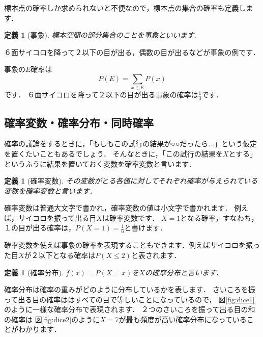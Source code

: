 \documentclass[11pt]{report}
\newtheorem{definition}[theorem]{定義}
\begin{document}
標本点の確率しか求められないと不便なので，標本点の集合の確率も定義します．

\begin{definition}[事象]
	標本空間の部分集合のことを事象といいます.
\end{definition}

６面サイコロを降って２以下の目が出る，偶数の目が出るなどが事象の例です．

事象の$E$確率は
\begin{equation*}
	P(E) = \sum_{x \in E} P(x)
\end{equation*}
です．
６面サイコロを降って２以下の目が出る事象の確率は$\frac{1}{3}$です．

\subsection{確率変数・確率分布・同時確率}

確率の議論をするときに，「もしもこの試行の結果が○○だったら...」という仮定を置くたいこともあるでしょう．
そんなときに，「この試行の結果を$X$とする」というふうに結果を置いておく変数を確率変数と言います．

\begin{definition}[確率変数]
	その変数がとる各値に対してそれぞれ確率が与えられている変数を確率変数と言います．
\end{definition}

確率変数は普通大文字で書かれ，確率変数の値は小文字で書かれます．
例えば，サイコロを振って出る目$X$は確率変数です．
$X=1$となる確率，すなわち，１の目が出る確率は，$P(X=1)=\frac{1}{6}$と書けます．

確率変数を使えば事象の確率を表現することもできます．例えばサイコロを振った目$X$が２以下となる確率は$P(X \leq 2)$と表されます．

\begin{definition}[確率分布]
	$f(x) = P(X=x)$を$X$の確率分布と言います．
\end{definition}

確率分布は確率の重みがどのように分布しているかを表します．
さいころを振って出る目の確率ははすべての目で等しいことになっているので，
図\ref{fig:dice1}のように一様な確率分布で表現されます．
２つのさいころを振って出る目の和の確率は
図\ref{fig:dice2}のように$X=7$が最も頻度が高い確率分布になっていることがわかります．
\end{document}
